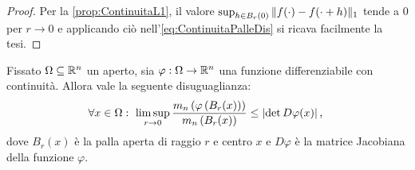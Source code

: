 \begin{proof}
	Per la \cref{prop:ContinuitaL1}, il valore $\sup_{h\in B_r(0)} \Vert f(\cdot)-f(\cdot+h)\Vert_1$ tende a $0$ per $r\to 0$ e applicando ciò nell'\cref{eq:ContinuitaPalleDis} si ricava facilmente la tesi.
\end{proof}


\begin{lemma}\label{lemma:LimiteDeterminante}
	Fissato $\Omega\subseteq\mathbb R^n$ un aperto, sia $\varphi:\Omega\to\mathbb R^n$ una funzione differenziabile con continuità.
	Allora vale la seguente disuguaglianza:
	\begin{equation*}
		\forall x\in\Omega:\ \limsup_{r\to 0} \frac{ m_n\left(\varphi\left(B_r(x)\right)\right)} {m_n\left(B_r(x)\right)}\le \lvert\det D\varphi(x)\rvert \, \text{, } 
	\end{equation*}
	dove $B_r(x)$ è la palla aperta di raggio $r$ e centro $x$ e $D\varphi$ è la matrice Jacobiana della funzione $\varphi$.
\end{lemma}

